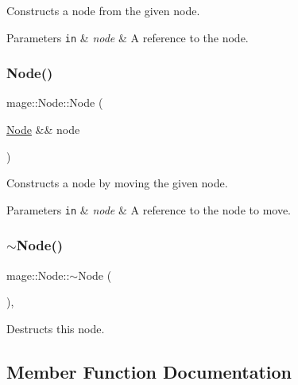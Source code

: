 Constructs a node from the given node.


\begin{DoxyParams}[1]{Parameters}
\mbox{\tt in}  & {\em node} & A reference to the node. \\
\hline
\end{DoxyParams}
\hypertarget{classmage_1_1_node_adbc40b6c4100f74faa2b59a7a0b79388}{}\label{classmage_1_1_node_adbc40b6c4100f74faa2b59a7a0b79388} 
\subsubsection{\texorpdfstring{Node()}{Node()}\hspace{0.1cm}{\footnotesize\ttfamily [3/3]}}
{\footnotesize\ttfamily mage\+::\+Node\+::\+Node (\begin{DoxyParamCaption}\item[{\hyperlink{classmage_1_1_node}{Node} \&\&}]{node }\end{DoxyParamCaption})\hspace{0.3cm}{\ttfamily [default]}}

Constructs a node by moving the given node.


\begin{DoxyParams}[1]{Parameters}
\mbox{\tt in}  & {\em node} & A reference to the node to move. \\
\hline
\end{DoxyParams}
\hypertarget{classmage_1_1_node_a1369fc11b331abacbaf11aeb5729e871}{}\label{classmage_1_1_node_a1369fc11b331abacbaf11aeb5729e871} 
\subsubsection{\texorpdfstring{$\sim$\+Node()}{~Node()}}
{\footnotesize\ttfamily mage\+::\+Node\+::$\sim$\+Node (\begin{DoxyParamCaption}{ }\end{DoxyParamCaption})\hspace{0.3cm}{\ttfamily [virtual]}, {\ttfamily [default]}}

Destructs this node. 

\subsection{Member Function Documentation}
\hypertarget{classmage_1_1_node_a11a7c052c5e4a6713d60aaad67dfde5d}{}\label{classmage_1_1_node_a11a7c052c5e4a6713d60aaad67dfde5d} 
